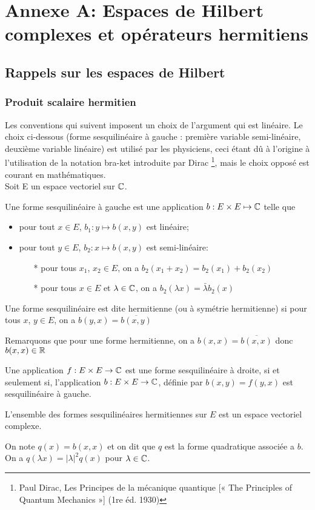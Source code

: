 \chapter*{Annexe A: Espaces de Hilbert complexes et opérateurs hermitiens}
\section{Rappels sur les espaces de Hilbert}
\subsection{Produit scalaire hermitien}
Les conventions qui suivent imposent un choix de l'argument qui est linéaire. Le choix ci-dessous (forme sesquilinéaire à gauche : première variable semi-linéaire, deuxième variable linéaire) est utilisé par les physiciens, ceci étant dû à l'origine à l'utilisation de la notation bra-ket introduite par Dirac \footnote{Paul Dirac, Les Principes de la mécanique quantique [« The Principles of Quantum Mechanics »] (1re éd. 1930) }, mais le choix opposé est courant en mathématiques.\\
Soit E un espace vectoriel sur $\mathbb C$.
\begin{definition}
Une forme sesquilinéaire à gauche est une application $b: E \times E \mapsto \mathbb C$ telle que
\begin{itemize}
	\item pour tout $x \in E$, $b_1: y \mapsto b(x,y)$ est linéaire;
	\item pour tout $y \in E$, $b_2: x \mapsto b(x,y)$ est semi-linéaire:
	\begin{itemize}
		\item[*] pour tous $x_1$, $x_2 \in E$, on a $b_2(x_1+x_2)=b_2(x_1)+b_2(x_2)$
		\item[*] pour tous $x \in E$ et $\lambda \in \mathbb C$, on a $b_2(\lambda x)=\bar{\lambda} b_2(x)$
	\end{itemize}
\end{itemize}

\end{definition}
\begin{definition}
	Une forme sesquilinéaire est dite hermitienne (ou à symétrie hermitienne) si pour tous $x$, $y \in E$, on a $b(y,x)=\overline{b(x,y)}$
\end{definition}
\begin{remark}
	Remarquons que pour une forme hermitienne, on a $b(x,x)=\overline{b(x,x)}$ donc $b(x,x) \in \mathbb R$
\end{remark}
\begin{remark}
	Une application $f : E \times E \rightarrow \mathbb C$ est une forme sesquilinéaire à droite, si et seulement si, l'application $b : E \times E \rightarrow \mathbb C$, définie par $b (x, y) = f (y, x)$ est sesquilinéaire à gauche. 
\end{remark}
\begin{proposition}
L’ensemble des formes sesquilinéaires hermitiennes sur $E$ est un espace vectoriel complexe.
\end{proposition}
On note $q(x)=b(x,x)$ et on dit que $q$ est la forme quadratique associée a $b$. On a $q(\lambda x)= |\lambda|^2 q(x)$ pour $\lambda \in \mathbb C$.

